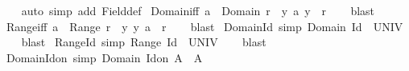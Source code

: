 \begin{isabellebody}
%
\isadelimproof
\ \ %
\endisadelimproof
%
\isatagproof
{}\isamarkupfalse%
\ {\isacharparenleft}{\kern0pt}auto\ simp\ add{\isacharcolon}{\kern0pt}\ Field{\isacharunderscore}{\kern0pt}def{\isacharparenright}{\kern0pt}%
\endisatagproof
{\isafoldproof}%
%
\isadelimproof
\isanewline
%
\endisadelimproof
\isanewline
{}\isamarkupfalse%
\ Domain{\isacharunderscore}{\kern0pt}iff{\isacharcolon}{\kern0pt}\ {\isachardoublequoteopen}a\ {\isasymin}\ Domain\ r\ {\isasymlongleftrightarrow}\ {\isacharparenleft}{\kern0pt}{\isasymexists}y{\isachardot}{\kern0pt}\ {\isacharparenleft}{\kern0pt}a{\isacharcomma}{\kern0pt}\ y{\isacharparenright}{\kern0pt}\ {\isasymin}\ r{\isacharparenright}{\kern0pt}{\isachardoublequoteclose}\isanewline
%
\isadelimproof
\ \ %
\endisadelimproof
%
\isatagproof
{}\isamarkupfalse%
\ blast%
\endisatagproof
{\isafoldproof}%
%
\isadelimproof
\isanewline
%
\endisadelimproof
\isanewline
{}\isamarkupfalse%
\ Range{\isacharunderscore}{\kern0pt}iff{\isacharcolon}{\kern0pt}\ {\isachardoublequoteopen}a\ {\isasymin}\ Range\ r\ {\isasymlongleftrightarrow}\ {\isacharparenleft}{\kern0pt}{\isasymexists}y{\isachardot}{\kern0pt}\ {\isacharparenleft}{\kern0pt}y{\isacharcomma}{\kern0pt}\ a{\isacharparenright}{\kern0pt}\ {\isasymin}\ r{\isacharparenright}{\kern0pt}{\isachardoublequoteclose}\isanewline
%
\isadelimproof
\ \ %
\endisadelimproof
%
\isatagproof
{}\isamarkupfalse%
\ blast%
\endisatagproof
{\isafoldproof}%
%
\isadelimproof
\isanewline
%
\endisadelimproof
\isanewline
{}\isamarkupfalse%
\ Domain{\isacharunderscore}{\kern0pt}Id\ {\isacharbrackleft}{\kern0pt}simp{\isacharbrackright}{\kern0pt}{\isacharcolon}{\kern0pt}\ {\isachardoublequoteopen}Domain\ Id\ {\isacharequal}{\kern0pt}\ UNIV{\isachardoublequoteclose}\isanewline
%
\isadelimproof
\ \ %
\endisadelimproof
%
\isatagproof
{}\isamarkupfalse%
\ blast%
\endisatagproof
{\isafoldproof}%
%
\isadelimproof
\isanewline
%
\endisadelimproof
\isanewline
{}\isamarkupfalse%
\ Range{\isacharunderscore}{\kern0pt}Id\ {\isacharbrackleft}{\kern0pt}simp{\isacharbrackright}{\kern0pt}{\isacharcolon}{\kern0pt}\ {\isachardoublequoteopen}Range\ Id\ {\isacharequal}{\kern0pt}\ UNIV{\isachardoublequoteclose}\isanewline
%
\isadelimproof
\ \ %
\endisadelimproof
%
\isatagproof
{}\isamarkupfalse%
\ blast%
\endisatagproof
{\isafoldproof}%
%
\isadelimproof
\isanewline
%
\endisadelimproof
\isanewline
{}\isamarkupfalse%
\ Domain{\isacharunderscore}{\kern0pt}Id{\isacharunderscore}{\kern0pt}on\ {\isacharbrackleft}{\kern0pt}simp{\isacharbrackright}{\kern0pt}{\isacharcolon}{\kern0pt}\ {\isachardoublequoteopen}Domain\ {\isacharparenleft}{\kern0pt}Id{\isacharunderscore}{\kern0pt}on\ A{\isacharparenright}{\kern0pt}\ {\isacharequal}{\kern0pt}\ A{\isachardoublequoteclose}\isanewline

\end{isabellebody}
